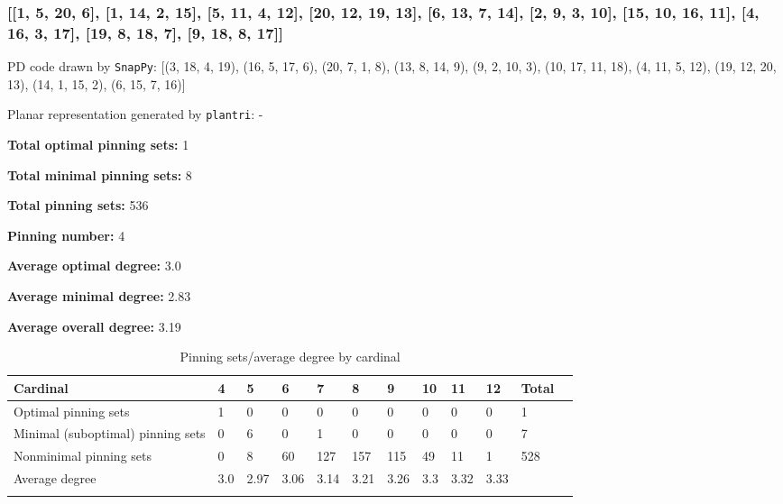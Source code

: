 \documentclass{article}%
\begin{document}
\newpage

\subsubsection{[[1, 5, 20, 6], [1, 14, 2, 15], [5, 11, 4, 12], [20, 12, 19, 13], [6, 13, 7, 14], [2, 9, 3, 10], [15, 10, 16, 11], [4, 16, 3, 17], [19, 8, 18, 7], [9, 18, 8, 17]]}

{\small\noindent PD code drawn by \texttt{SnapPy}: [(3, 18, 4, 19), (16, 5, 17, 6), (20, 7, 1, 8), (13, 8, 14, 9), (9, 2, 10, 3), (10, 17, 11, 18), (4, 11, 5, 12), (19, 12, 20, 13), (14, 1, 15, 2), (6, 15, 7, 16)]}

{\small\noindent Planar representation generated by \texttt{plantri}: -}

\begin{multicols}{2}
{\normalsize \noindent\textbf{Total optimal pinning sets:} 1

\noindent\textbf{Total minimal pinning sets:} 8

\noindent\textbf{Total pinning sets:} 536

\noindent\textbf{Pinning number:} 4

}
\columnbreak

{\normalsize \noindent\textbf{Average optimal degree:} 3.0

\noindent\textbf{Average minimal degree:} 2.83

\noindent\textbf{Average overall degree:} 3.19

}
\end{multicols}

\begin{table}[ht]
	\caption{Pinning sets/average degree by cardinal}
	\centering
	\renewcommand{\arraystretch}{1.5}
	\begin{tabularx}{\textwidth}{lXXXXXXXXXXX}
		\toprule
			Cardinal & 4 & 5 & 6 & 7 & 8 & 9 & 10 & 11 & 12 & Total\\
			\hline
			Optimal pinning sets & 1 & 0 & 0 & 0 & 0 & 0 & 0 & 0 & 0 & 1 \\
			Minimal (suboptimal) pinning sets & 0 & 6 & 0 & 1 & 0 & 0 & 0 & 0 & 0 & 7 \\
			Nonminimal pinning sets & 0 & 8 & 60 & 127 & 157 & 115 & 49 & 11 & 1 & 528 \\
			Average degree & 3.0 & 2.97 & 3.06 & 3.14 & 3.21 & 3.26 & 3.3 & 3.32 & 3.33 &  \\
		\bottomrule \\ 
	\end{tabularx}
\end{table}
\end{document}
